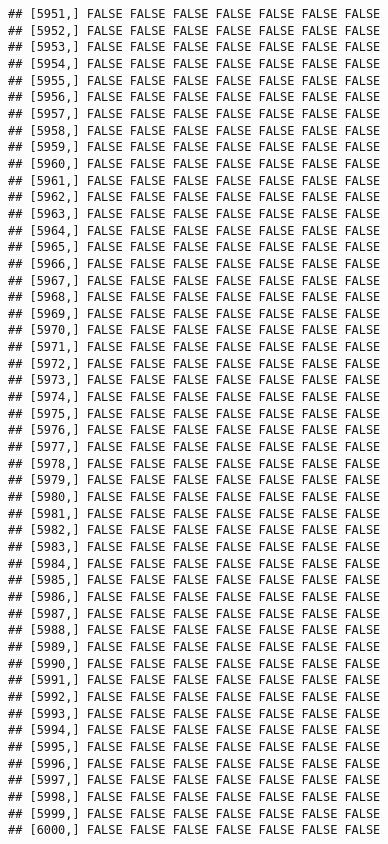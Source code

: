 \documentclass[
]{article}
\begin{document}
\begin{verbatim}
## [5951,] FALSE FALSE FALSE FALSE FALSE FALSE FALSE
## [5952,] FALSE FALSE FALSE FALSE FALSE FALSE FALSE
## [5953,] FALSE FALSE FALSE FALSE FALSE FALSE FALSE
## [5954,] FALSE FALSE FALSE FALSE FALSE FALSE FALSE
## [5955,] FALSE FALSE FALSE FALSE FALSE FALSE FALSE
## [5956,] FALSE FALSE FALSE FALSE FALSE FALSE FALSE
## [5957,] FALSE FALSE FALSE FALSE FALSE FALSE FALSE
## [5958,] FALSE FALSE FALSE FALSE FALSE FALSE FALSE
## [5959,] FALSE FALSE FALSE FALSE FALSE FALSE FALSE
## [5960,] FALSE FALSE FALSE FALSE FALSE FALSE FALSE
## [5961,] FALSE FALSE FALSE FALSE FALSE FALSE FALSE
## [5962,] FALSE FALSE FALSE FALSE FALSE FALSE FALSE
## [5963,] FALSE FALSE FALSE FALSE FALSE FALSE FALSE
## [5964,] FALSE FALSE FALSE FALSE FALSE FALSE FALSE
## [5965,] FALSE FALSE FALSE FALSE FALSE FALSE FALSE
## [5966,] FALSE FALSE FALSE FALSE FALSE FALSE FALSE
## [5967,] FALSE FALSE FALSE FALSE FALSE FALSE FALSE
## [5968,] FALSE FALSE FALSE FALSE FALSE FALSE FALSE
## [5969,] FALSE FALSE FALSE FALSE FALSE FALSE FALSE
## [5970,] FALSE FALSE FALSE FALSE FALSE FALSE FALSE
## [5971,] FALSE FALSE FALSE FALSE FALSE FALSE FALSE
## [5972,] FALSE FALSE FALSE FALSE FALSE FALSE FALSE
## [5973,] FALSE FALSE FALSE FALSE FALSE FALSE FALSE
## [5974,] FALSE FALSE FALSE FALSE FALSE FALSE FALSE
## [5975,] FALSE FALSE FALSE FALSE FALSE FALSE FALSE
## [5976,] FALSE FALSE FALSE FALSE FALSE FALSE FALSE
## [5977,] FALSE FALSE FALSE FALSE FALSE FALSE FALSE
## [5978,] FALSE FALSE FALSE FALSE FALSE FALSE FALSE
## [5979,] FALSE FALSE FALSE FALSE FALSE FALSE FALSE
## [5980,] FALSE FALSE FALSE FALSE FALSE FALSE FALSE
## [5981,] FALSE FALSE FALSE FALSE FALSE FALSE FALSE
## [5982,] FALSE FALSE FALSE FALSE FALSE FALSE FALSE
## [5983,] FALSE FALSE FALSE FALSE FALSE FALSE FALSE
## [5984,] FALSE FALSE FALSE FALSE FALSE FALSE FALSE
## [5985,] FALSE FALSE FALSE FALSE FALSE FALSE FALSE
## [5986,] FALSE FALSE FALSE FALSE FALSE FALSE FALSE
## [5987,] FALSE FALSE FALSE FALSE FALSE FALSE FALSE
## [5988,] FALSE FALSE FALSE FALSE FALSE FALSE FALSE
## [5989,] FALSE FALSE FALSE FALSE FALSE FALSE FALSE
## [5990,] FALSE FALSE FALSE FALSE FALSE FALSE FALSE
## [5991,] FALSE FALSE FALSE FALSE FALSE FALSE FALSE
## [5992,] FALSE FALSE FALSE FALSE FALSE FALSE FALSE
## [5993,] FALSE FALSE FALSE FALSE FALSE FALSE FALSE
## [5994,] FALSE FALSE FALSE FALSE FALSE FALSE FALSE
## [5995,] FALSE FALSE FALSE FALSE FALSE FALSE FALSE
## [5996,] FALSE FALSE FALSE FALSE FALSE FALSE FALSE
## [5997,] FALSE FALSE FALSE FALSE FALSE FALSE FALSE
## [5998,] FALSE FALSE FALSE FALSE FALSE FALSE FALSE
## [5999,] FALSE FALSE FALSE FALSE FALSE FALSE FALSE
## [6000,] FALSE FALSE FALSE FALSE FALSE FALSE FALSE

\end{verbatim}
\end{document}
